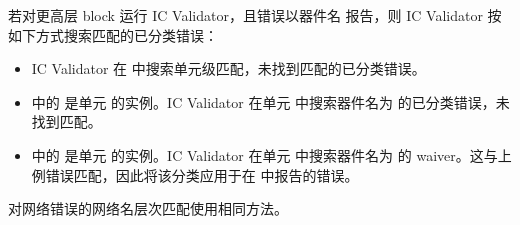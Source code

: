若对更高层 block  运行 IC Validator，且错误以器件名  报告，则 IC Validator 按如下方式搜索匹配的已分类错误：
\begin{itemize}
  \item IC Validator 在  中搜索单元级匹配，未找到匹配的已分类错误。
  \item {} 中的  是单元  的实例。IC Validator 在单元  中搜索器件名为  的已分类错误，未找到匹配。
  \item {} 中的  是单元  的实例。IC Validator 在单元  中搜索器件名为  的 waiver。这与上例错误匹配，因此将该分类应用于在  中报告的错误。
\end{itemize}

对网络错误的网络名层次匹配使用相同方法。
